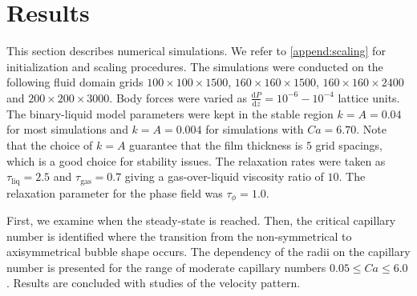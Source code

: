 \documentclass[preprint,12pt]{elsarticle}
\begin{document}
\section{Results}
\label{sec:results}
This section describes numerical simulations. We refer to \ref{append:scaling} for
initialization and scaling procedures. The simulations were conducted on the following 
fluid domain grids $100 \times 100 \times 1500$, $160 \times 160 \times 1500$,
$160 \times 160 \times 2400$ and $200 \times 200 \times 3000$. Body forces were varied as
$\frac{\mathrm{d}P}{\mathrm{d}z}=10^{-6}-10^{-4}$ lattice units.{\color{red} The binary-liquid model
parameters
were kept in
the stable region $k=A=0.04$ for most simulations and $k=A=0.004$ for simulations with $Ca=6.70$. 
Note that the choice of $k=A$ guarantee that the film thickness is $5$ grid spacings, which is a
good choice for stability issues. } The relaxation rates were taken as $\tau_{\mathrm{liq}}=2.5$
and $\tau_{\mathrm{gas}}=0.7$ giving a gas-over-liquid viscosity ratio of $10$. The relaxation
parameter for the phase field was $\tau_{\phi}=1.0$.

First, we examine when the steady-state is
reached. Then, the critical capillary number is identified where the transition from the
non-symmetrical to axisymmetrical bubble shape occurs. The dependency of the radii on the capillary
number is presented for the range of moderate capillary numbers $0.05 \leq Ca \leq 6.0$. Results are
concluded with studies of the velocity pattern.
\end{document}
